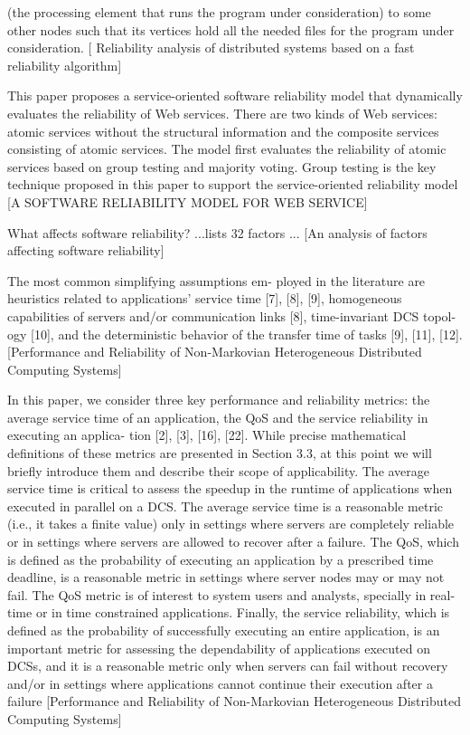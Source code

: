 \documentclass{cslthse-msc}
\begin{document}
(the processing element that runs the program under consideration) to some other nodes such that its vertices hold all the needed files for the program under consideration. [ Reliability analysis of distributed systems based on a fast reliability algorithm]

This paper proposes a service-oriented software reliability model that dynamically evaluates the reliability of Web services. There are two kinds of Web services: atomic services without the structural information and the composite services consisting of atomic services. The model first evaluates the reliability of atomic services based on group testing and majority voting. Group testing is the key technique proposed in this paper to support the service-oriented reliability model [A SOFTWARE RELIABILITY MODEL FOR WEB SERVICE]

What affects software reliability? ...lists 32 factors ... [An analysis of factors affecting software reliability]

The most common simplifying assumptions em- ployed in the literature are heuristics related to applications’ service time [7], [8], [9], homogeneous capabilities of servers and/or communication links [8], time-invariant DCS topol- ogy [10], and the deterministic behavior of the transfer time of tasks [9], [11], [12]. [Performance and Reliability of Non-Markovian Heterogeneous Distributed Computing Systems]

In this paper, we consider three key performance and reliability metrics: the average service time of an application, the QoS and the service reliability in executing an applica- tion [2], [3], [16], [22]. While precise mathematical definitions of these metrics are presented in Section 3.3, at this point we will briefly introduce them and describe their scope of applicability. The average service time is critical to assess the speedup in the runtime of applications when executed in parallel on a DCS. The average service time is a reasonable metric (i.e., it takes a finite value) only in settings where servers are completely reliable or in settings where servers are allowed to recover after a failure. The QoS, which is defined as the probability of executing an application by a prescribed time deadline, is a reasonable metric in settings where server nodes may or may not fail. The QoS metric is of interest to system users and analysts, specially in real-time or in time constrained applications. Finally, the service reliability, which is defined as the probability of successfully executing an entire application, is an important metric for assessing the dependability of applications executed on DCSs, and it is a reasonable metric only when servers can fail without recovery and/or in settings where applications cannot continue their execution after a failure [Performance and Reliability of Non-Markovian Heterogeneous Distributed Computing Systems]
\end{document}
